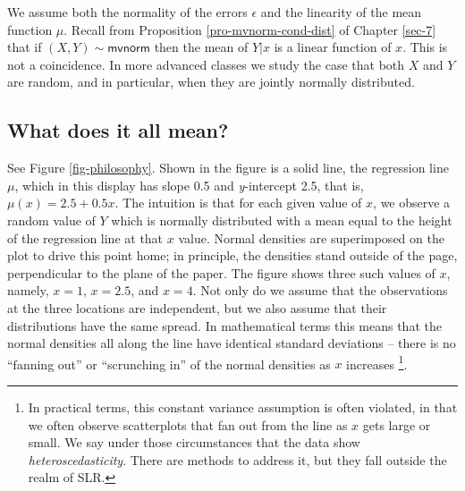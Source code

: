 \documentclass[captions=tableheading]{scrbook}
\begin{document}
\begin{rem}
We assume both the normality of the errors \(\epsilon\) and the linearity of the mean function \( \mu \). Recall from Proposition \ref{pro-mvnorm-cond-dist} of Chapter \ref{sec-7} that if \( (X,Y)\sim\mathsf{mvnorm} \) then the mean of \(Y|x\) is a linear function of \(x\). This is not a coincidence. In more advanced classes we study the case that both \(X\) and \(Y\) are random, and in particular, when they are jointly normally distributed.
\end{rem}
\subsection{What does it all mean?}
\label{sec-11-1-1}

See Figure \ref{fig-philosophy}. Shown in the figure is a solid line, the regression line \(\mu\), which in this display has slope 0.5 and \emph{y}-intercept 2.5, that is, \( \mu(x) = 2.5 + 0.5x \). The intuition is that for each given value of \(x\), we observe a random value of \(Y\) which is normally distributed with a mean equal to the height of the regression line at that \(x\) value. Normal densities are superimposed on the plot to drive this point home; in principle, the densities stand outside of the page, perpendicular to the plane of the paper. The figure shows three such values of \(x\), namely, \( x = 1 \), \( x = 2.5 \), and \( x = 4 \). Not only do we assume that the observations at the three locations are independent, but we also assume that their distributions have the same spread. In mathematical terms this means that the normal densities all along the line have identical standard deviations -- there is no ``fanning out'' or ``scrunching in'' of the normal densities as \(x\) increases
\footnote{In practical terms, this constant variance assumption is often violated, in that we often observe scatterplots that fan out from the line as \(x\) gets large or small. We say under those circumstances that the data show \emph{heteroscedasticity}. There are methods to address it, but they fall outside the realm of SLR.}.
\end{document}
